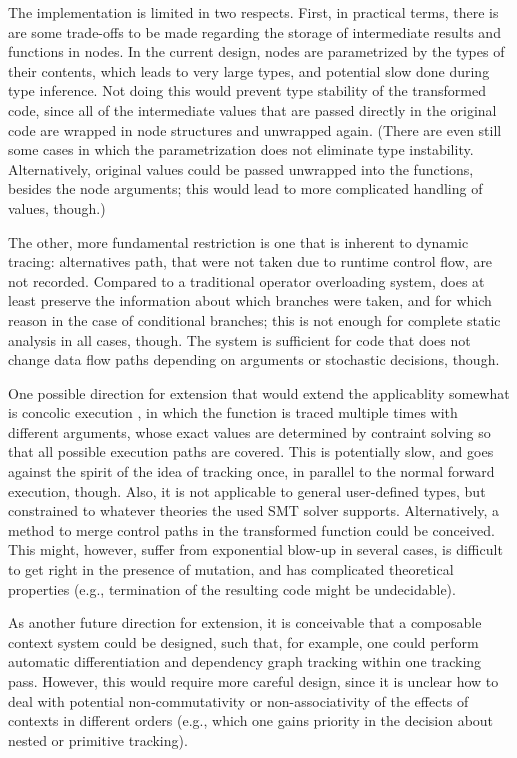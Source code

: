 The implementation is limited in two respects.  First, in practical terms, there is are some
trade-offs to be made regarding the storage of intermediate results and functions in nodes.  In the
current design, nodes are parametrized by the types of their contents, which leads to very large
types, and potential slow done during type inference.  Not doing this would prevent type stability
of the transformed code, since all of the intermediate values that are passed directly in the
original code are wrapped in node structures and unwrapped again.  (There are even still some cases
in which the parametrization does not eliminate type instability.  Alternatively, original values
could be passed unwrapped into the  functions, besides the node arguments; this
would lead to more complicated handling of values, though.)

The other, more fundamental restriction is one that is inherent to dynamic tracing: alternatives
path, that were not taken due to runtime control flow, are not recorded.  Compared to a traditional
operator overloading system, \irtrackerjl{} does at least preserve the information about which
branches were taken, and for which reason in the case of conditional branches; this is not enough
for complete static analysis in all cases, though.  The system is sufficient for code that does not
change data flow paths depending on arguments or stochastic decisions, though.

One possible direction for extension that would extend the applicablity somewhat is concolic
execution \parencite{zeller2019concolic}, in which the function is traced multiple times with
different arguments, whose exact values are determined by contraint solving so that all possible
execution paths are covered.  This is potentially slow, and goes against the spirit of the idea of
tracking once, in parallel to the normal forward execution, though.  Also, it is not applicable to
general user-defined types, but constrained to whatever theories the used SMT solver supports.
Alternatively, a method to merge control paths in the transformed function could be conceived.  This
might, however, suffer from exponential blow-up in several cases, is difficult to get right in the
presence of mutation, and has complicated theoretical properties (e.g., termination of the resulting
code might be undecidable).

As another future direction for extension, it is conceivable that a composable context system could
be designed, such that, for example, one could perform automatic differentiation and dependency
graph tracking within one tracking pass.  However, this would require more careful design, since it
is unclear how to deal with potential non-commutativity or non-associativity of the effects of
contexts in different orders (e.g., which one gains priority in the decision about nested or
primitive tracking).



